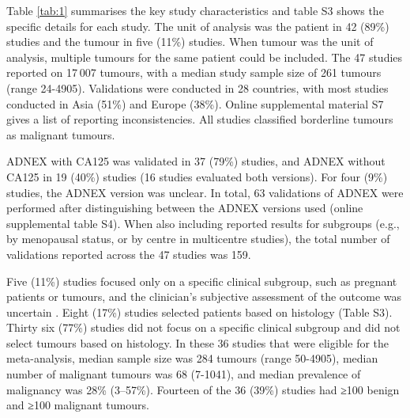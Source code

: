 Table \ref{tab:1} summarises the key study characteristics and table S3 shows the specific details for each study. The unit of analysis was the patient in 42 (89\%) studies and the tumour in five (11\%) studies. When tumour was the unit of analysis, multiple tumours for the same patient could be included. The 47 studies reported on 17 007 tumours, with a median study sample size of 261 tumours (range 24-4905). Validations were conducted in 28 countries, with most studies conducted in Asia (51\%) and Europe (38\%). Online supplemental material S7 gives a list of reporting inconsistencies. All studies classified borderline tumours as malignant tumours.



\gls{ADNEX} with CA125 was validated in 37 (79\%) studies, and \gls{ADNEX} without CA125 in
19 (40\%) studies (16 studies evaluated both versions). For four (9\%) studies, the ADNEX version was unclear. In total, 63 validations of ADNEX were performed after distinguishing between the ADNEX versions used (online supplemental table S4). When also including reported results for subgroups (e.g., by
menopausal status, or by centre in multicentre studies), the total number of
validations reported across the 47 studies was 159.

Five (11\%) studies focused only on a specific clinical subgroup, such as pregnant patients or tumours, and the clinician's subjective assessment of the outcome was uncertain
 \cite{quarantaSurgeryBenignOvarian2020,
  czekierdowskiSonographicAssessmentComplex2021,
  leeUltrasonographicEvaluationOvarian2021,nohuzReliabilityIOTAScore2019,
  szubertPerformanceSelectedModels2020}.
Eight (17\%) studies selected patients based on histology (Table S3). Thirty six (77\%) studies did not focus on a specific clinical subgroup and did not select tumours based on histology. In these 36 studies that were eligible for the meta-analysis, median sample size was 284 tumours (range 50-4905), median number of malignant tumours was 68 (7-1041), and median prevalence of malignancy was 28\% (3–57\%). Fourteen of the 36 (39\%) studies had ≥100 benign and ≥100 malignant tumours.

